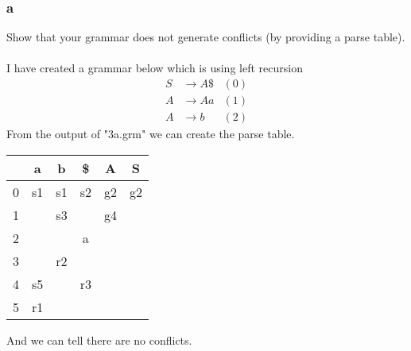 \documentclass[12pt]{article}
\begin{document}
\subsubsection*{a}
Show that your grammar does not generate conflicts (by providing a parse table).\\
\\
I have created a grammar below which is using left recursion
\begin{align*}
S&\rightarrow A\$ &(0) \\
A&\rightarrow Aa &(1) \\
A&\rightarrow b &(2)
\end{align*}
From the output of "3a.grm" we can create the parse table.
\begin{center}
\begin{tabular}{c|c|c|c|c|c}
 & a & b & \$ & A & S\\ 
\hline 
0 & s1 & s1 & s2 & g2 & g2  \\
\hline 
1 &  & s3 &  & g4 &  \\ 
\hline 
2 &  &  & a & & \\ 
\hline 
3 &  & r2 &  &  &  \\ 
\hline 
4 & s5 &  & r3 &  \\ 
\hline 
5 & r1 &  &  &  &  \\ 
\hline 
\end{tabular} 
\end{center}
And we can tell there are no conflicts.
\end{document}
